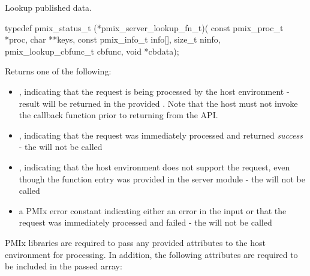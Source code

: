 \summary

Lookup published data.

\format

\cspecificstart
\begin{codepar}
typedef pmix_status_t (*pmix_server_lookup_fn_t)(
                             const pmix_proc_t *proc,
                             char **keys,
                             const pmix_info_t info[],
                             size_t ninfo,
                             pmix_lookup_cbfunc_t cbfunc,
                             void *cbdata);
\end{codepar}
\cspecificend

\begin{arglist}
\end{arglist}

Returns one of the following:

\begin{itemize}
    \item {}, indicating that the request is being processed by the host environment - result will be returned in the provided . Note that the host must not invoke the callback function prior to returning from the \ac{API}.
    \item {}, indicating that the request was immediately processed and returned \textit{success} - the  will not be called
    \item {}, indicating that the host environment does not support the request, even though the function entry was provided in the server module - the  will not be called
    \item a PMIx error constant indicating either an error in the input or that the request was immediately processed and failed - the  will not be called
\end{itemize}

\reqattrstart
\ac{PMIx} libraries are required to pass any provided attributes to the host environment for processing. In addition, the following attributes are required to be included in the passed  array:

